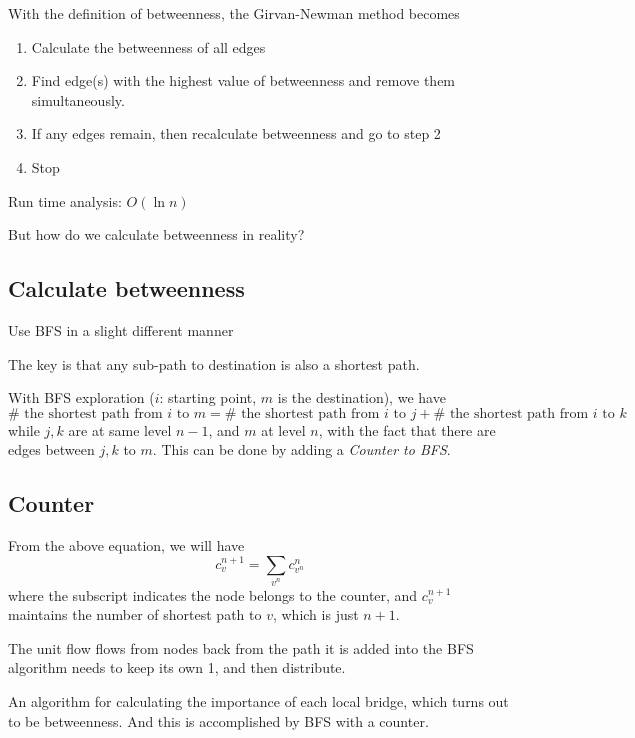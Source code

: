 With the definition of betweenness, the Girvan-Newman method becomes
\begin{enumerate}
	\item Calculate the betweenness of all edges
	\item Find edge(s) with the highest value of betweenness and remove them simultaneously.
	\item If any edges remain, then recalculate betweenness and go to step 2
	\item Stop
\end{enumerate}
Run time analysis: $O(\ln n)$

But how do we calculate betweenness in reality?
\subsection{Calculate betweenness}
\begin{intuition}
	Use BFS in a slight different manner
\end{intuition}
\begin{remark}
	The key is that any sub-path to destination is also a shortest path.
\end{remark}


With BFS exploration ($i$: starting point, $m$ is the destination), we have
\[
	\#\text{ the shortest path from $i$ to $m$} =  \#\text{ the shortest path from $i$ to $j$} +  \#\text{ the shortest path from $i$ to $k$}
\]
while $j, k$ are at same level $n-1$, and $m$ at level $n$, with the fact that there are edges between $j, k$ to $m$. This can be done by adding a \emph{Counter to BFS}.

\subsection{Counter}
From the above equation, we will have
\[
	c_{v}^{n+1} = \sum_{v^n}c^n_{v^n}
\]
where the subscript indicates the node belongs to the counter, and $c_v^{n+1}$ maintains the number of shortest path to $v$, which is just $n+1$.

The unit flow flows from nodes back from the path it is added into the BFS algorithm needs to keep its own 1, and then distribute.

\begin{remark}
	An algorithm for calculating the importance of each local bridge, which turns out to be betweenness. And this is accomplished by BFS with a counter.
\end{remark}